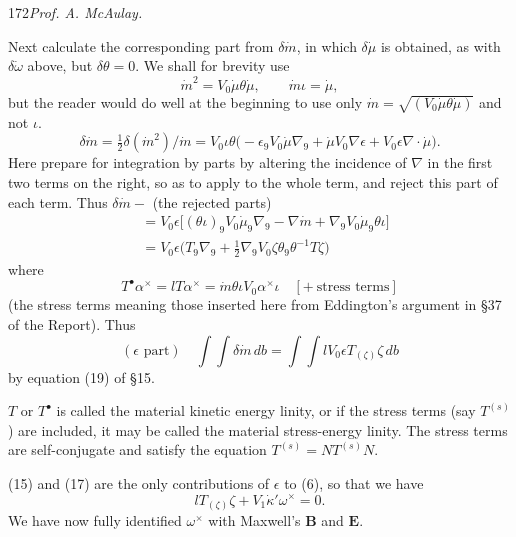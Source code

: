 \documentclass[11pt]{article}
\begin{document}
\newpage\thispagestyle{empty}\begin{center}172\hfill \textit{Prof. A. McAulay.}\end{center}
Next calculate the corresponding part from $\delta\dot m$, in which $\delta\dot\mu$ is obtained, as with $\delta\dot\omega$ above, but $\delta\theta=0$. We shall for brevity use
\[
  \dot m^2=V_0\dot\mu\theta\dot\mu,\qquad \dot m\iota=\dot\mu,
\]
but the reader would do well at the beginning to use only $\dot m=\sqrt{(V_0\dot\mu\theta\dot\mu)}$ and not $\iota$.
\[
  \delta\dot m=\tfrac12\delta(\dot m^2)/\dot m
  =V_0\iota\theta\bigl(-\epsilon_9V_0\dot\mu\nabla_9+\dot\mu V_0\nabla\epsilon+V_0\epsilon\nabla\mathbin{\cdot}\dot\mu\bigr).
\]
Here prepare for integration by parts by altering the incidence of $\nabla$ in the first two terms on the right, so as to apply to the whole term, and reject this part of each term. Thus $\delta\dot m-$ (the rejected parts)
\[
  \begin{aligned}
    &=V_0\epsilon\bigl[(\theta\iota)_9V_0\dot\mu_9\nabla_9-\nabla\dot m+\nabla_9V_0\dot\mu_9\theta\iota\bigr]\\
    &=V_0\epsilon\bigl(T_9\nabla_9+\tfrac12\nabla_9V_0\zeta\theta_9\theta^{-1}T\zeta\bigr)
  \end{aligned}
\]
where
\begin{equation}
  T^\bullet\alpha^\times=lT\alpha^\times=\dot m\theta\iota V_0\alpha^\times\iota\quad[+\ \text{stress terms}]
  \tag{16}
\end{equation}
(the stress terms meaning those inserted here from Eddington's argument in §37 of the Report). Thus
\begin{equation}
  (\epsilon\text{ part})\quad\int\!\int\delta\dot m\,db
  =\int\!\int lV_0\epsilon T_{(\zeta)}\zeta\,db
  \tag{17}
\end{equation}
by equation (19) of §15.

\indent $T$ or $T^\bullet$ is called the material kinetic energy linity, or if the stress terms (say $T^{(s)}$) are included, it may be called the material stress-energy linity. The stress terms are self-conjugate and satisfy the equation $T^{(s)}=NT^{(s)}N$.

\indent (15) and (17) are the only contributions of $\epsilon$ to (6), so that we have
\begin{equation}
  lT_{(\zeta)}\zeta+V_1\dot\kappa'\omega^\times=0.
  \tag{18}
\end{equation}
We have now fully identified $\omega^\times$ with Maxwell's $\mathbf{B}$ and $\mathbf{E}$.
\end{document}

